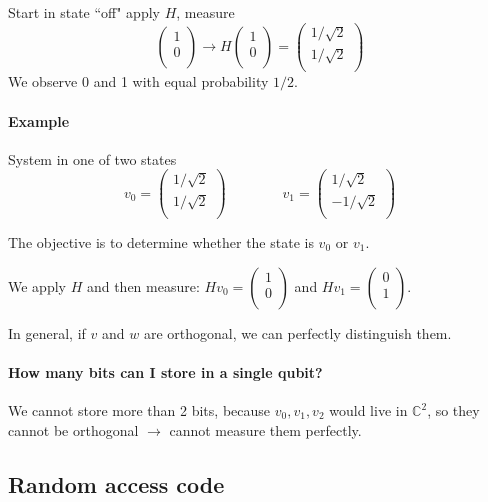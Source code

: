 \documentclass{article}
\begin{document}
Start in state ``off" apply $H$, measure
\[\begin{pmatrix}
1\\ 0\\
\end{pmatrix}
\to 
H
\begin{pmatrix}
1\\ 0\\
\end{pmatrix}
=\begin{pmatrix}
1/\sqrt{2}\\
1/\sqrt{2}\\
\end{pmatrix}
\]
We observe 0 and 1 with equal probability $1/2$.

\paragraph{Example}
System in one of two states
\[v_0= \begin{pmatrix}
1/\sqrt{2}\\
1/\sqrt{2}\\
\end{pmatrix}
\qquad \qquad
v_1= \begin{pmatrix}
1/\sqrt{2}\\
-1/\sqrt{2}\\
\end{pmatrix}
\]

The objective is to determine whether the state is $v_0$ or $v_1$.
\medskip

We apply $H$ and then measure: $Hv_0=\begin{pmatrix}
1\\0\\
\end{pmatrix}$
and $Hv_1=\begin{pmatrix}
0\\1\\
\end{pmatrix}$.

In general, if $v$ and $w$ are orthogonal, we can perfectly distinguish them.

\paragraph{How many bits can I store in a single qubit?}
We cannot store more than 2 bits, because $v_0,v_1,v_2$ would live in $\mathbb{C}^2$, so they cannot be orthogonal $\to$ cannot measure them perfectly.


\subsection*{Random access code}
\end{document}
